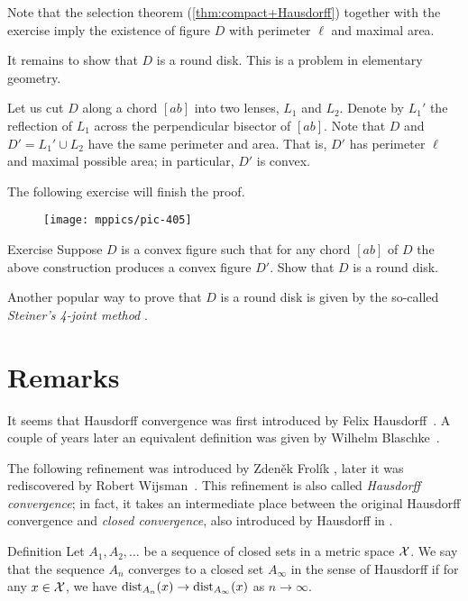 Note that the selection theorem (\ref{thm:compact+Hausdorff}) together with the exercise imply the existence of figure $D$ with perimeter $\ell$ and maximal area.

It remains to show that $D$ is a round disk.
This is a problem in elementary geometry.

Let us cut $D$ along a chord $[ab]$ into two lenses, $L_1$ and $L_2$.
Denote by $L_1'$ the reflection of $L_1$ across the perpendicular bisector of $[ab]$.
Note that $D$ and $D'=L_1'\cup L_2$ have the same perimeter and area.
That is, $D'$ has perimeter $\ell$ and maximal possible area;
in particular, $D'$ is convex.

The following exercise will finish the proof.
\qeds

{

\begin{wrapfigure}{o}{57 mm}
\vskip-5mm
\centering
\texttt{[image: mppics/pic-405]}
\end{wrapfigure}

\begin{thm}{Exercise}\label{ex:round-disc}
Suppose $D$ is a convex figure such that for any chord $[ab]$ of $D$ the above construction produces a convex figure $D'$.
Show that $D$ is a round disk.
\end{thm}


}

Another popular way to prove that $D$ is a round disk is given by the so-called {}\emph{Steiner's 4-joint method} \cite{blaschke}.

\section{Remarks}\label{sec:H-variation}

It seems that Hausdorff convergence was first introduced by Felix Hausdorff~\cite{hausdorff}.
A couple of years later an equivalent definition was given by Wilhelm Blaschke~\cite{blaschke}.

The following refinement was introduced by  Zdeněk Frolík \cite{frolik},
later it was rediscovered by Robert Wijsman~\cite{wijsman}.  
This refinement is also called \emph{Hausdorff convergence};
in fact, it takes an intermediate place between the original Hausdorff convergence and {}\emph{closed convergence}, also introduced by Hausdorff in \cite{hausdorff}.

\begin{thm}{Definition}\label{def:gen-Haus-conv}
Let $A_1,A_2,\dots$ be a sequence of closed sets in a metric space $\mathcal{X}$.
We say that the sequence $A_n$ converges to a closed set $A_\infty$ in the sense of Hausdorff if for any $x\in\mathcal{X}$, we have
$\distfun_{A_n}(x)\z\to \distfun_{A_\infty}(x)$ as $n\to\infty$.
\end{thm}

